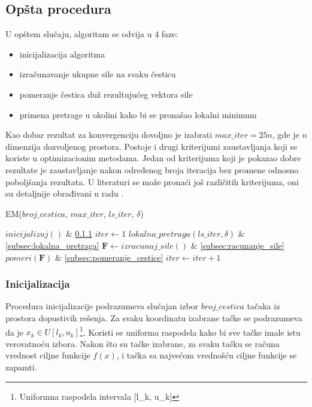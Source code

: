 \documentclass[a4paper]{article}
\begin{document}
\subsection{Opšta procedura}
\label{subsec:procedura}

U opštem slučaju, algoritam se odvija u 4 faze:
\begin{itemize}
    \item inicijalizacija algoritma
    \item izračunavanje ukupne sile na svaku česticu
    \item pomeranje čestica duž rezultujućeg vektora sile
    \item primena pretrage u okolini kako bi se pronašao lokalni minimum
\end{itemize}

Kao dobar rezultat za konvergenciju dovoljno je izabrati $max\_iter = 25n$, gde je $n$ dimenzija dozvoljenog prostora. Postoje i drugi kriterijumi zaustavljanja koji se koriste u optimizacionim metodama. Jedan od kriterijuma koji je pokazao dobre rezultate je zaustavljanje nakon određenog broja iteracija bez promene odnosno poboljšanja rezultata. U literaturi se može pronaći još različitih kriterijuma, oni su detaljnije obrađivani u radu \cite{kriterijumi}.

\begin{algorithm}[H]
\caption{EM($broj\_cestica$, $max\_iter$, $ls\_iter$, $\delta$)}
\begin{algorithmic}[1]
\label{alg:opsta_procedura}
\STATE $inicijalizuj()$ & \ref{subsec:inicijalizacija}
\STATE $iter \leftarrow 1$
\STATE $lokalna\_pretraga(ls\_iter, \delta)$ & \ref{subsec:lokalna_pretraga}
\STATE $\boldsymbol{F} \leftarrow izracunaj\_sile()$ & \ref{subsec:racunanje_sile}
\STATE $pomeri(\boldsymbol{F})$ & \ref{subsec:pomeranje_cestice}
\STATE $iter \leftarrow iter + 1$
\ENDWHILE
\end{algorithmic}
\end{algorithm}
\subsubsection{Inicijalizacija}
\label{subsec:inicijalizacija}
Procedura inicijalizacije podrazumeva slučajan izbor $broj\_cestica$ tačaka iz prostora dopustivih rešenja. Za svaku koordinatu izabrane tačke se podrazumeva da je $x_{k} \in \textit{U}[l_{k}, u_{k}]$\footnote{Uniformna raspodela intervala [l_{k}, u_{k}]}. Koristi se uniforma raspodela kako bi sve tačke imale istu verovatnoću izbora. Nakon što su tačke izabrane, za svaku tačku se računa vrednost ciljne funkcije $f(x)$, i tačka sa najvećom vrednošću ciljne funkcije se zapamti.
\end{document}
